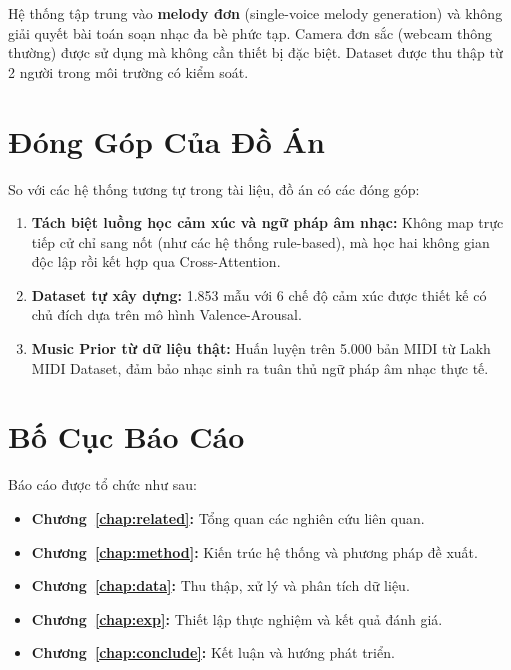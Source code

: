 Hệ thống tập trung vào \textbf{melody đơn} (single-voice melody generation)
và không giải quyết bài toán soạn nhạc đa bè phức tạp.
Camera đơn sắc (webcam thông thường) được sử dụng mà không cần thiết bị đặc biệt.
Dataset được thu thập từ 2 người trong môi trường có kiểm soát.

\section{Đóng Góp Của Đồ Án}

So với các hệ thống tương tự trong tài liệu, đồ án có các đóng góp:
\begin{enumerate}
  \item \textbf{Tách biệt luồng học cảm xúc và ngữ pháp âm nhạc:}
        Không map trực tiếp cử chỉ sang nốt (như các hệ thống rule-based),
        mà học hai không gian độc lập rồi kết hợp qua Cross-Attention.
  \item \textbf{Dataset tự xây dựng:} 1.853 mẫu với 6 chế độ cảm xúc
        được thiết kế có chủ đích dựa trên mô hình Valence-Arousal.
  \item \textbf{Music Prior từ dữ liệu thật:} Huấn luyện trên
        5.000 bản MIDI từ Lakh MIDI Dataset, đảm bảo nhạc sinh ra
        tuân thủ ngữ pháp âm nhạc thực tế.
\end{enumerate}

\section{Bố Cục Báo Cáo}

Báo cáo được tổ chức như sau:
\begin{itemize}
  \item \textbf{Chương~\ref{chap:related}:} Tổng quan các nghiên cứu liên quan.
  \item \textbf{Chương~\ref{chap:method}:} Kiến trúc hệ thống và phương pháp đề xuất.
  \item \textbf{Chương~\ref{chap:data}:} Thu thập, xử lý và phân tích dữ liệu.
  \item \textbf{Chương~\ref{chap:exp}:} Thiết lập thực nghiệm và kết quả đánh giá.
  \item \textbf{Chương~\ref{chap:conclude}:} Kết luận và hướng phát triển.
\end{itemize}
